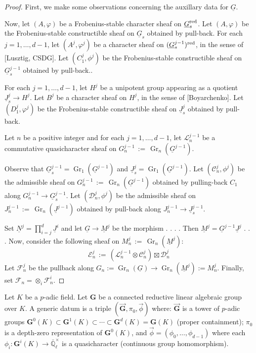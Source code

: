 \documentclass[10pt]{amsart}
\theoremstyle{plain}
\theoremstyle{definition}
\newcommand{\EE}{\mathbb{\bar Q}_\ell}
\newcommand{\EEx}{\EE^\times}
\newcommand{\G}{\textbf{G}}
\DeclareMathOperator{\Gr}{Gr}
\newcommand{\ceq}{{\, :=\, }}
\newcommand{\cs}[1]{{\mathcal{#1}}}
\begin{document}
\begin{proof}
First, we make some observations concerning the auxillary data for $\underline{G}$. 


Now, let $(A,\varphi)$ be a Frobenius-stable character sheaf on $\underline{G}_s^{\operatorname{red}}$.
Let $(A,\varphi)$ be the Frobenius-stable constructible sheaf on $\underline{G}_s$ obtained by pull-back.
For each $j=1,\ldots, d-1$, 
let $(A^j, \varphi^j)$ be a character sheaf on $(\underline{G}^{j-1}_s)^{\operatorname{red}}$, in the sense of [Lusztig, CSDG].
Let $(C_1^j, \phi^j)$ be the Frobenius-stable constructible sheaf on $\underline{G}^{j-1}_s$ obtained by pull-back..

For each $j=1,\ldots, d-1$,
let $H^j$ be a unipotent group appearing as a quotient $\underline{J}^j_s \to H^j$.
Let $B^j$ be a character sheaf on $H^j$, in the sense of [Boyarchenko].
Let $(D_1^j,\varphi^j)$ be the Frobenius-stable constructible sheaf on $\underline{J}^{j}_s$ obtained by pull-back.

Let $n$ be a positive integer and
for each $j=1,\ldots, d-1$, let $\cs{L}_n^{j-1}$ be a commutative quasicharacter sheaf on $G_n^{j-1}\ceq \Gr_n(\underline{G}^{j-1})$.

Observe that $\underline{G}^{j-1}_s = \Gr_1(\underline{G}^{j-1})$ 
and $\underline{J}^{j}_s = \Gr_1(\underline{G}^{j-1})$. 
Let $(\cs{C}_n^j,\phi^j)$ be the admissible sheaf on $G_n^{j-1} \ceq \Gr_n(\underline{G}^{j-1})$ obtained by pulling-back $C_1$ along $G_n^{j-1} \to \underline{G}^{j-1}_s$.
Let $(\cs{D}_n^j,\phi^j)$ be the admissible sheaf on $J_n^{j-1} \ceq \Gr_n(\underline{J}^{j-1})$ obtained by pull-back along $J_n^{j-1} \to \underline{J}^{j-1}_s$.


Set $\underline{N}^j = \prod_{i=j}^d \underline{J}^i$ and let $\underline{G} \to \underline{M}^j$ be the morphism . . . .
Then $\underline{M}^j = \underline{G}^{j-1} \underline{J}^j$ . . . 
%
Now, consider the following sheaf on $M_n^j \ceq \Gr_n(\underline{M}^j)$:
\[
\cs{E}_n^j \ceq (\cs{L}_n^{j-1}\otimes \cs{C}_n^j) \boxtimes \cs{D}_n^{j}
\]
Let $\cs{F}_n^j$ be the pullback along $G_n :=\Gr_n(\underline{G}) \to \Gr_n(\underline{M}^j):= M_n^j$.
Finally, set $\cs{F}_n = \otimes_i \cs{F}^i_n$.


\end{proof}


\iffalse

Let $K$ be a $p$-adic field. Let $\G$ be a connected reductive linear algebraic group over $K$. 
A generic datum is a triple $(\vec{\G}, \pi_0, \vec{\phi})$ where: $\vec{\G}$ is a tower of $p$-adic groups $\G^0(K) \subset \G^1(K) \subset \cdots  \subset \G^d(K) = \G(K)$ (proper containment); $\pi_0$ is a depth-zero representation of $\G^0(K)$, and $\vec{\phi} = (\phi_0, \ldots , \phi_{d-1})$ where each $\phi_i : \G^i(K) \to \EEx$ is a quasicharacter (continuous group homomorphism).  
\end{document}
